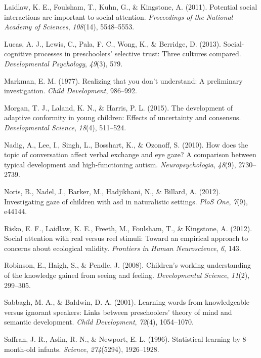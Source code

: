 \documentclass[floatsintext,man]{apa6}
\theoremstyle{definition}
\theoremstyle{definition}
\theoremstyle{definition}
\theoremstyle{remark}
\begin{document}
\hypertarget{ref-laidlaw2011potential}{}
Laidlaw, K. E., Foulsham, T., Kuhn, G., \& Kingstone, A. (2011).
Potential social interactions are important to social attention.
\emph{Proceedings of the National Academy of Sciences}, \emph{108}(14),
5548--5553.

\hypertarget{ref-lucas2013social}{}
Lucas, A. J., Lewis, C., Pala, F. C., Wong, K., \& Berridge, D. (2013).
Social-cognitive processes in preschoolers' selective trust: Three
cultures compared. \emph{Developmental Psychology}, \emph{49}(3), 579.

\hypertarget{ref-markman1977realizing}{}
Markman, E. M. (1977). Realizing that you don't understand: A
preliminary investigation. \emph{Child Development}, 986--992.

\hypertarget{ref-morgan2015development}{}
Morgan, T. J., Laland, K. N., \& Harris, P. L. (2015). The development
of adaptive conformity in young children: Effects of uncertainty and
consensus. \emph{Developmental Science}, \emph{18}(4), 511--524.

\hypertarget{ref-nadig2010does}{}
Nadig, A., Lee, I., Singh, L., Bosshart, K., \& Ozonoff, S. (2010). How
does the topic of conversation affect verbal exchange and eye gaze? A
comparison between typical development and high-functioning autism.
\emph{Neuropsychologia}, \emph{48}(9), 2730--2739.

\hypertarget{ref-noris2012investigating}{}
Noris, B., Nadel, J., Barker, M., Hadjikhani, N., \& Billard, A. (2012).
Investigating gaze of children with asd in naturalistic settings.
\emph{PloS One}, \emph{7}(9), e44144.

\hypertarget{ref-risko2012social}{}
Risko, E. F., Laidlaw, K. E., Freeth, M., Foulsham, T., \& Kingstone, A.
(2012). Social attention with real versus reel stimuli: Toward an
empirical approach to concerns about ecological validity.
\emph{Frontiers in Human Neuroscience}, \emph{6}, 143.

\hypertarget{ref-robinson2008children}{}
Robinson, E., Haigh, S., \& Pendle, J. (2008). Children's working
understanding of the knowledge gained from seeing and feeling.
\emph{Developmental Science}, \emph{11}(2), 299--305.

\hypertarget{ref-sabbagh2001learning}{}
Sabbagh, M. A., \& Baldwin, D. A. (2001). Learning words from
knowledgeable versus ignorant speakers: Links between preschoolers'
theory of mind and semantic development. \emph{Child Development},
\emph{72}(4), 1054--1070.

\hypertarget{ref-saffran1996statistical}{}
Saffran, J. R., Aslin, R. N., \& Newport, E. L. (1996). Statistical
learning by 8-month-old infants. \emph{Science}, \emph{274}(5294),
1926--1928.
\end{document}
